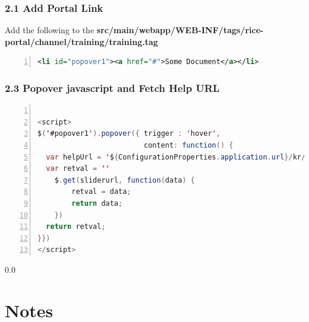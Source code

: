 \subsubsection*{2.1 Add Portal Link}
Add the following to the \textbf{src/main/webapp/WEB-INF/tags/rice-portal/channel/training/training.tag}
\begin{lstlisting}[basicstyle=\scriptsize,numbers=left,language=xml,backgroundcolor=\color{ubergray},caption={web/src/main/webapp/WEB-INF/tags/rice-portal/trainingTab.tag},frame=single,breaklines=true]
		<li id="popover1"><a href="#">Some Document</a></li>
\end{lstlisting}


\subsubsection*{2.3 Popover javascript and Fetch Help URL}
\begin{lstlisting}[basicstyle=\scriptsize,numbers=left,language=java,backgroundcolor=\color{ubergray},caption={web/src/main/webapp/WEB-INF/tags/rice-portal/trainingTab.tag},frame=single,breaklines=true]

<script>
$('#popover1').popover({ trigger : 'hover',
                         content: function() {
  var helpUrl = '${ConfigurationProperties.application.url}/kr/help.do?methodToCall=getDocumentHelpText&amp;documentTypeName=IdentityManagementPersonDocument'
  var retval = ''  
    $.get(sliderurl, function(data) {
        retval = data;
        return data;
    })
  return retval;
}})
</script>
\end{lstlisting}

\newpage
  {\setlength{\baselineskip}%
           {0.0\baselineskip}
  \section*{Notes}
  \hrulefill \par}

